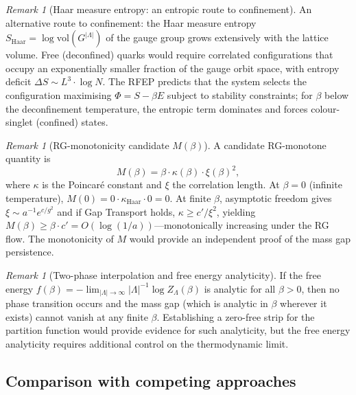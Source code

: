 \documentclass[12pt,a4paper]{article}
\theoremstyle{definition}
\theoremstyle{plain}
\theoremstyle{remark}
\newtheorem{remark}[definition]{Remark}
\begin{document}
\begin{remark}[Haar measure entropy: an entropic route to confinement]
\label{rem:haar-entropy}
An alternative route to confinement: the Haar measure entropy $S_{\mathrm{Haar}} = \log \mathrm{vol}(G^{|\Lambda|})$ of the gauge group grows extensively with the lattice volume. Free (deconfined) quarks would require correlated configurations that occupy an exponentially smaller fraction of the gauge orbit space, with entropy deficit $\Delta S \sim L^3 \cdot \log N$. The RFEP predicts that the system selects the configuration maximising $\Phi = S - \beta E$ subject to stability constraints; for $\beta$ below the deconfinement temperature, the entropic term dominates and forces colour-singlet (confined) states.
\end{remark}

\begin{remark}[RG-monotonicity candidate $M(\beta)$]
\label{rem:rg-monotone}
A candidate RG-monotone quantity is
\[
M(\beta) = \beta \cdot \kappa(\beta) \cdot \xi(\beta)^2,
\]
where $\kappa$ is the Poincar\'e constant and $\xi$ the correlation length. At $\beta = 0$ (infinite temperature), $M(0) = 0 \cdot \kappa_{\mathrm{Haar}} \cdot 0 = 0$. At finite $\beta$, asymptotic freedom gives $\xi \sim a^{-1} e^{c/g^2}$ and if Gap Transport holds, $\kappa \geq c'/\xi^2$, yielding $M(\beta) \geq \beta \cdot c' = O(\log(1/a))$---monotonically increasing under the RG flow. The monotonicity of $M$ would provide an independent proof of the mass gap persistence.
\end{remark}

\begin{remark}[Two-phase interpolation and free energy analyticity]
\label{rem:two-phase}
If the free energy $f(\beta) = -\lim_{|\Lambda| \to \infty} |\Lambda|^{-1} \log Z_\Lambda(\beta)$ is analytic for all $\beta > 0$, then no phase transition occurs and the mass gap (which is analytic in $\beta$ wherever it exists) cannot vanish at any finite $\beta$. Establishing a zero-free strip for the partition function would provide evidence for such analyticity, but the free energy analyticity requires additional control on the thermodynamic limit.
\end{remark}

\subsection{Comparison with competing approaches}
\end{document}

